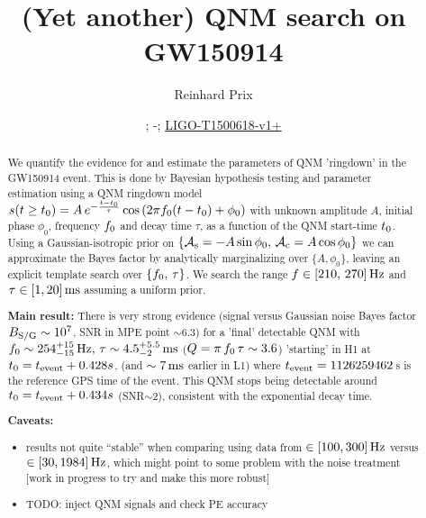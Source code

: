 \documentclass[aps,prd,onecolumn,notitlepage,nofootinbib,superscriptaddress,altaffilletter,floatfix]{revtex4-1}
\newcommand{\dcc}{LIGO-T1500618-v1+}
\begin{document}
\title{(Yet another) QNM search on GW150914}


\author{Reinhard Prix}
\date{\commitDATE; \commitIDshort-\commitSTATUS; \href{https://dcc.ligo.org/LIGO-T1500618}{\dcc}}


\begin{abstract}
  We quantify the evidence for and estimate the parameters of QNM 'ringdown' in the GW150914 event.
  This is done by Bayesian hypothesis testing and parameter estimation using a QNM ringdown model
  $s(t\ge t_0) = A\,e^{-\frac{t-t_0}{\tau}}\cos\left(2\pi f_0 (t-t_0) + \phi_0\right)$ with unknown amplitude $A$, initial phase $\phi_0$,
  frequency $f_0$ and decay time $\tau$, as a function of the QNM start-time $t_0$.
  Using a Gaussian-isotropic prior on $\{\mathcal{A}_{\mathrm{s}}=-A\sin\phi_0,\,\mathcal{A}_{\mathrm{c}}=A\cos\phi_0\}$ we can approximate the Bayes factor by analytically marginalizing over
  $\{A,\phi_0\}$, leaving an explicit template search over $\{f_0,\,\tau\}$. We search the range $f\in[210,\,270]\,\mathrm{Hz}$ and $\tau \in [1, 20]\,\mathrm{ms}$
  assuming a uniform prior.

  \textbf{Main result:}
  There is very strong evidence (signal versus Gaussian noise Bayes factor $B_{\mathrm{S/G}}\sim10^{7}$, SNR in MPE point $\sim6.3$) for a 'final' detectable QNM
  with $f_0\sim254^{+15}_{-15}\,\mathrm{Hz},\,\tau\sim4.5^{+5.5}_{-2}\,\mathrm{ms}$ ($Q = \pi\,f_0\,\tau \sim 3.6$) 'starting' in H1 at $t_0 = t_{\mathrm{event}} + 0.428s$, (and $\sim7\,\mathrm{ms}$ earlier in L1)
  where $t_{\mathrm{event}} = 1126259462\,$s is the reference GPS time of the event.
  This QNM stops being detectable around $t_0 = t_{\mathrm{event}}+0.434s$ (SNR$\sim2$), consistent with the exponential decay time.

  \textbf{Caveats:}
  \begin{itemize}
  \item results not quite ``stable'' when comparing using data from $\in[100,300]\,\mathrm{Hz}$ versus $\in[30,1984]\,\mathrm{Hz}$, which might point to some problem
    with the noise treatment [work in progress to try and make this more robust]
  \item TODO: inject QNM signals and check PE accuracy
  \end{itemize}
\end{abstract}
\end{document}
